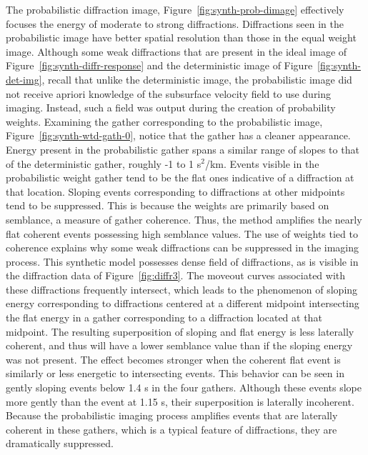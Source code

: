 The probabilistic diffraction image, Figure~\ref{fig:synth-prob-dimage} effectively focuses the energy of moderate to strong diffractions. Diffractions seen in the probabilistic image have better spatial resolution than those in the equal weight image.  Although some weak diffractions that are present in the ideal image of Figure~\ref{fig:synth-diffr-response} and the deterministic image of Figure~\ref{fig:synth-det-img}, recall that unlike the deterministic image, the probabilistic image did not receive apriori knowledge of the subsurface velocity field to use during imaging.  Instead, such a field was output during the creation of probability weights. Examining the gather corresponding to the probabilistic image, Figure~\ref{fig:synth-wtd-gath-0}, notice that the gather has a cleaner appearance. Energy present in the probabilistic gather spans a similar range of slopes to that of the deterministic gather, roughly -1 to 1 s$^2$/km.   Events visible in the probabilistic weight gather tend to be the flat ones indicative of a diffraction at that location.  Sloping events corresponding to diffractions at other midpoints tend to be suppressed. This is because the weights are primarily based on semblance, a measure of gather coherence.  Thus, the method amplifies the nearly flat coherent events possessing high semblance values. The use of weights tied to coherence explains why some weak diffractions can be suppressed in the imaging process.  This synthetic model possesses dense field of diffractions, as is visible in the diffraction data of Figure~\ref{fig:diffr3}.  The moveout curves associated with these diffractions frequently intersect, which leads to the phenomenon of sloping energy corresponding to diffractions centered at a different midpoint intersecting the flat energy in a gather corresponding to a diffraction located at that midpoint.  The resulting superposition of sloping and flat energy is less laterally coherent, and thus will have a lower semblance value than if the sloping energy was not present.  The effect becomes stronger when the coherent flat event is similarly or less energetic to intersecting events.  This behavior can be seen in gently sloping events below 1.4 s in the four gathers.  Although these events slope more gently than the event at 1.15 s,  their superposition is laterally incoherent.  Because the probabilistic imaging process amplifies events that are laterally coherent in these gathers, which is a typical feature of diffractions, they are dramatically suppressed.  



